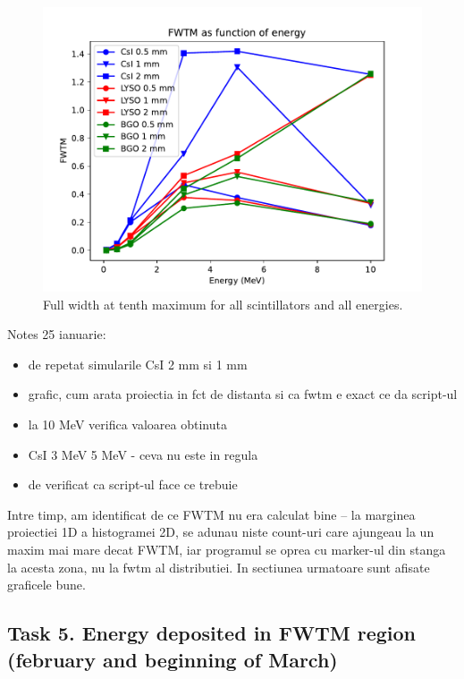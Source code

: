 \documentclass{article}
\begin{document}
\begin{figure}[H]
    \centering
    \includegraphics[width=\linewidth]{images/task4/FWTM_all.pdf}
    \caption{Full width at tenth maximum for all scintillators and all energies.}
\end{figure}

Notes 25 ianuarie:

\begin{itemize}
  \item de repetat simularile CsI 2 mm si 1 mm
  \item grafic, cum arata proiectia in fct de distanta si ca fwtm e exact ce da script-ul
  \item la 10 MeV verifica valoarea obtinuta
  \item CsI 3 MeV 5 MeV - ceva nu este in regula
  \item de verificat ca script-ul face ce trebuie
\end{itemize}

Intre timp, am identificat de ce FWTM nu era calculat bine -- la marginea proiectiei 1D a histogramei 2D, se adunau niste count-uri care ajungeau la un maxim mai mare decat FWTM,
iar programul se oprea cu marker-ul din stanga la acesta zona, nu la fwtm al distributiei. In sectiunea urmatoare sunt afisate graficele bune.

\subsection{Task 5. Energy deposited in FWTM region (february and beginning of March)}
\end{document}
